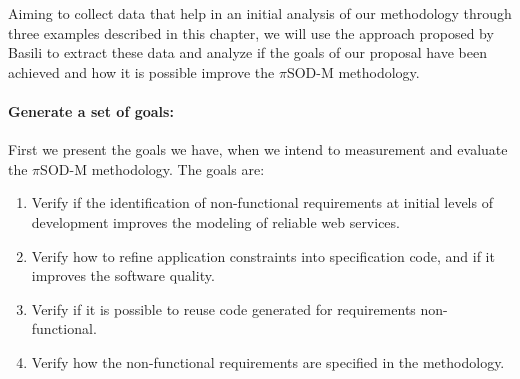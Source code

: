 \bigskip

Aiming to collect data that help in an initial analysis of our methodology
through three examples described in this chapter, we will use the approach
proposed by Basili \cite{basili:1985} to extract these data and analyze if the goals of
our proposal have been achieved and how it is possible improve the $\pi$SOD-M
methodology. 
% 

\paragraph{Generate a set of goals:} First we present the goals we have, when we
intend to measurement and evaluate the $\pi$SOD-M methodology. The goals are:

% 

\begin{enumerate}
  \item  Verify if the identification of non-functional requirements at initial
  levels of development improves the modeling of reliable web services.
  

  \item  Verify how to refine application constraints into specification code,
  and if it improves the software quality.
  

  \item  Verify if it is possible to reuse code generated for requirements
non-functional.


  \item  Verify how the non-functional requirements are specified in the
  methodology.

\end{enumerate}


